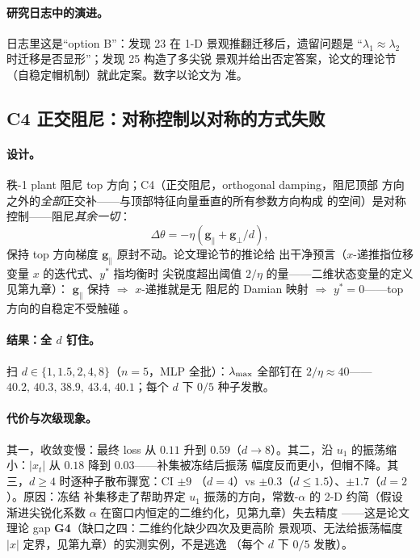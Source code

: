\paragraph{研究日志中的演进。}
日志里这是``option B''：发现 23 在 1-D 景观推翻迁移后，遗留问题是
``$\lambda_{1}\approx\lambda_{2}$ 时迁移是否显形''；发现 25 构造了多尖锐
景观并给出否定答案，论文的理论节（自稳定帽机制）就此定案。数字以论文为
准。

\subsection{C4 正交阻尼：对称控制以对称的方式失败}
\label{sec:ch07-orth}

\paragraph{设计。}
秩-1 plant 阻尼 top 方向；C4（正交阻尼，orthogonal damping，阻尼顶部
方向之外的\emph{全部}正交补——与顶部特征向量垂直的所有参数方向构成
的空间）是对称控制——阻尼\emph{其余一切}：
\begin{equation}
  \Delta\theta=-\eta\left(\mathbf{g}_{\parallel}+\mathbf{g}_{\perp}/d\right),
  \label{eq:ch07-orth}
\end{equation}
保持 top 方向梯度 $\mathbf{g}_{\parallel}$ 原封不动。论文理论节的推论给
出干净预言（$x$-递推指位移变量 $x$ 的迭代式、$y^{*}$ 指均衡时
尖锐度超出阈值 $2/\eta$ 的量——二维状态变量的定义见第九章）：
$\mathbf{g}_{\parallel}$ 保持 $\Rightarrow$ $x$-递推就是无
阻尼的 Damian 映射 $\Rightarrow$ $y^{*}=0$——top 方向的自稳定不受触碰
。

\paragraph{结果：全 $d$ 钉住。}
扫 $d\in\{1,1.5,2,4,8\}$（$n{=}5$，MLP 全批）：$\lambda_{\max}$ 全部钉在
$2/\eta\approx40$——$40.2,\,40.3,\,38.9,\,43.4,\,40.1$；每个 $d$ 下
$0/5$ 种子发散。

\paragraph{代价与次级现象。}
其一，收敛变慢：最终 loss 从 $0.11$ 升到 $0.59$（$d\to8$）。其二，沿
$u_{1}$ 的振荡缩小：$|x_{t}|$ 从 $0.18$ 降到 $0.03$——补集被冻结后振荡
幅度反而更小，但帽不降。其三，$d\geq4$ 时逐种子散布骤宽：CI $\pm9$
（$d{=}4$）vs $\pm0.3$（$d\leq1.5$）、$\pm1.7$（$d{=}2$）。原因：冻结
补集移走了帮助界定 $u_{1}$ 振荡的方向，常数-$\alpha$ 的 2-D 约简（假设渐进尖锐化系数 $\alpha$ 在窗口内恒定的二维约化，见第九章）失去精度
——这是论文理论 gap \textbf{G4}（缺口之四：二维约化缺少四次及更高阶
景观项、无法给振荡幅度 $|x|$ 定界，见第九章）的实测实例，不是逃逸
（每个 $d$ 下 $0/5$
发散）。

